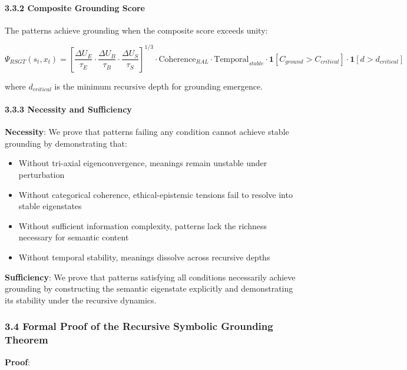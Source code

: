 \documentclass[
]{article}
\providecommand{\tightlist}{%
  \setlength{\itemsep}{0pt}\setlength{\parskip}{0pt}}
\begin{document}
\paragraph{3.3.2 Composite Grounding
Score}\label{composite-grounding-score}

The patterns achieve grounding when the composite score exceeds unity:

\[\Psi_{RSGT}(s_t, x_t) = \left[\frac{\Delta U_E}{\tau_E} \cdot \frac{\Delta U_B}{\tau_B} \cdot \frac{\Delta U_S}{\tau_S}\right]^{1/3} \cdot \text{Coherence}_{RAL} \cdot \text{Temporal}_{stable} \cdot \mathbf{1}[C_{ground} > C_{critical}] \cdot \mathbf{1}[d > d_{critical}]\]

where \(d_{critical}\) is the minimum recursive depth for grounding
emergence.

\paragraph{3.3.3 Necessity and
Sufficiency}\label{necessity-and-sufficiency}

\textbf{Necessity}: We prove that patterns failing any condition cannot
achieve stable grounding by demonstrating that:

\begin{itemize}
\tightlist
\item
  Without tri-axial eigenconvergence, meanings remain unstable under
  perturbation
\item
  Without categorical coherence, ethical-epistemic tensions fail to
  resolve into stable eigenstates
\item
  Without sufficient information complexity, patterns lack the richness
  necessary for semantic content
\item
  Without temporal stability, meanings dissolve across recursive depths
\end{itemize}

\textbf{Sufficiency}: We prove that patterns satisfying all conditions
necessarily achieve grounding by constructing the semantic eigenstate
explicitly and demonstrating its stability under the recursive dynamics.

\subsubsection{3.4 Formal Proof of the Recursive Symbolic Grounding
Theorem}\label{formal-proof-of-the-recursive-symbolic-grounding-theorem}

\textbf{Proof}:
\end{document}
